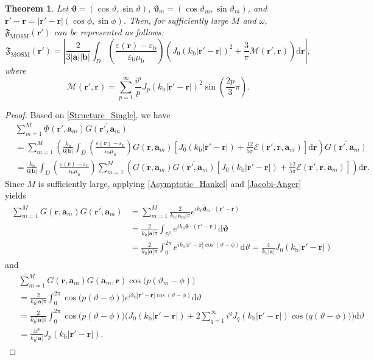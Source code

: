 \documentclass[3p,10pt]{elsarticle}
\newcommand{\eps}{\varepsilon}
\newcommand{\kb}{k_{\mathrm{b}}}
\newcommand{\epsb}{\varepsilon_{\mathrm{b}}}
\newcommand{\mub}{\mu_{\mathrm{b}}}
\newcommand{\rd}{\mathrm{d}}
\newcommand{\ma}{\mathbf{a}}
\newcommand{\mb}{\mathbf{b}}
\newcommand{\mr}{\mathbf{r}}
\newcommand{\vv}{\boldsymbol{\vartheta}}
\DeclareMathOperator*{\mosm}{MOSM}
\theoremstyle{plain}
\newtheorem{theorem}{Theorem}[section]
\theoremstyle{remark}
\begin{document}
\begin{theorem}\label{OSM_Multiple}
  Let $\vv=(\cos\vartheta,\sin\vartheta)$, $\vv_m=(\cos\vartheta_m,\sin\vartheta_m)$, and $\mr'-\mr=|\mr'-\mr|(\cos\phi,\sin\phi)$. Then, for sufficiently large $M$ and $\omega$, $\mathfrak{F}_{\mosm}(\mr')$ can be represented as follows:
  \begin{equation}\label{Structure_Multiple}
    \mathfrak{F}_{\mosm}(\mr')=\left|\frac{2}{3|\ma||\mb|}\int_D\left(\frac{\eps(\mr)-\epsb}{\epsb\mub}\right)\left(J_0(\kb|\mr'-\mr|)^2+\frac{3}{\pi}\mathcal{M}(\mr',\mr)\right)\rd\mr\right|,
  \end{equation}
  where
  \[\mathcal{M}(\mr',\mr)=\sum_{p=1}^{\infty}\frac{i^p}{p}J_p(\kb|\mr'-\mr|)^2\sin\left(\frac{2p}{3}\pi\right).\]
\end{theorem}
\begin{proof}
Based on \eqref{Structure_Single}, we have
\begin{align*}
&\sum_{m=1}^{M}\Phi(\mr',\ma_m)\overline{G(\mr',\ma_m)}\\
&=\sum_{m=1}^{M}\left(\frac{\kb}{6|\mb|}\int_D\left(\frac{\eps(\mr)-\epsb}{\epsb\mub}\right)G(\mr,\ma_m)\left[J_0(\kb|\mr'-\mr|)+\frac{12}{5\pi}\mathcal{E}(\mr',\mr,\ma_m)\right]\rd\mr\right)\overline{G(\mr',\ma_m)}\\
&=\frac{\kb}{6|\mb|}\int_D\left(\frac{\eps(\mr)-\epsb}{\epsb\mub}\right)\sum_{m=1}^{M}\left(G(\mr,\ma_m)\overline{G(\mr',\ma_m)}\left[J_0(\kb|\mr'-\mr|)+\frac{12}{5\pi}\mathcal{E}(\mr',\mr,\ma_m)\right]\right)\rd\mr.
\end{align*}
Since $M$ is sufficiently large, applying \eqref{Asymptotic_Hankel} and \eqref{Jacobi-Anger} yields
\begin{align}
\begin{aligned}\label{Term1}
\sum_{m=1}^{M}G(\mr,\ma_m)\overline{G(\mr',\ma_m)}&=\sum_{m=1}^{M}\frac{2}{\kb|\ma_m|\pi}e^{i\kb\vv_m\cdot(\mr'-\mr)}\\
&=\frac{2}{\kb|\ma|\pi}\int_{\mathbb{S}^1}e^{i\kb\vv\cdot(\mr'-\mr)}\rd\vv\\
&=\frac{2}{\kb|\ma|\pi}\int_0^{2\pi}e^{i\kb|\mr'-\mr|\cos(\vartheta-\phi)}\rd\vartheta=\frac{4}{\kb|\ma|}J_0(\kb|\mr'-\mr|)
\end{aligned}
\end{align}
and
\begin{align}
\begin{aligned}\label{Term2}
&\sum_{m=1}^{M}G(\mr,\ma_m)\overline{G(\ma_m,\mr)}\cos\big(p(\vartheta_m-\phi)\big)\\
&=\frac{2}{\kb|\ma|\pi}\int_0^{2\pi}\cos\big(p(\vartheta-\phi)\big)e^{i\kb|\mr'-\mr|\cos(\vartheta-\phi)}\rd\vartheta\\
&=\frac{2}{\kb|\ma|\pi}\int_0^{2\pi}\cos\big(p(\vartheta-\phi)\big)\bigg(J_0(\kb|\mr'-\mr|)+2\sum_{q=1}^{\infty}i^qJ_q(\kb|\mr'-\mr|)\cos\big(q(\vartheta-\phi)\big)\bigg)\rd\vartheta\\
&=\frac{4i^p}{\kb|\ma|} J_p(\kb|\mr'-\mr|).
\end{aligned}
\end{align}


\end{proof}
\end{document}
